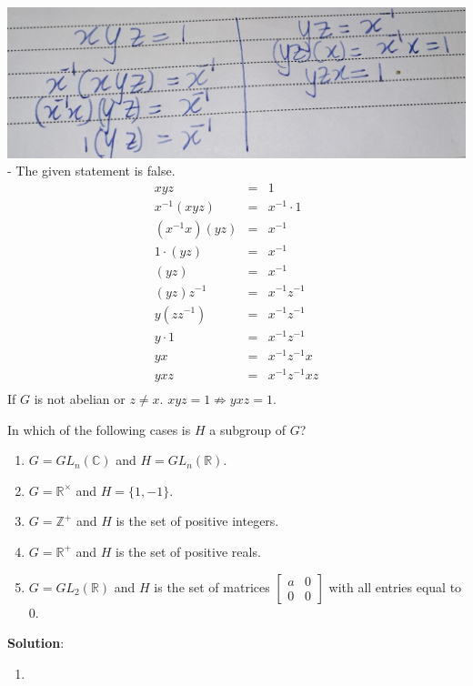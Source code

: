 \documentclass[
]{book}
\providecommand{\tightlist}{%
  \setlength{\itemsep}{0pt}\setlength{\parskip}{0pt}}
\begin{document}
\includegraphics{figures/ch_2/fig18.jpg} - The given statement is false.
\begin{eqnarray}
          xyz&=&1\\
  x^{-1}(xyz)&=&x^{-1} \cdot 1\\
  (x^{-1}x)(yz)&=&x^{-1}\\
  1 \cdot(yz)&=&x^{-1}\\
  (yz)&=&x^{-1}\\
  (yz)z^{-1}&=&x^{-1}z^{-1}\\
  y(zz^{-1})&=&x^{-1}z^{-1}\\
  y \cdot 1&=&x^{-1}z^{-1}\\
  yx&=&x^{-1}z^{-1}x\\
  yxz&=&x^{-1}z^{-1}xz\\
\end{eqnarray} If \(G\) is not abelian or \(z\neq x\).
\(xyz=1 \nRightarrow yxz=1\).

\leavevmode{}%
In which of the following cases is \(H\) a subgroup of \(G\)?

\begin{enumerate}
\def\labelenumi{(\alph{enumi})}
\item
  \(G = GL_n(\mathbb{C})\) and \(H = GL_n(\mathbb{R})\).
\item
  \(G = \mathbb{R}^\times\) and \(H = \{1, -1\}\).
\item
  \(G = \mathbb{Z}^+\) and \(H\) is the set of positive integers.
\item
  \(G = \mathbb{R}^+\) and \(H\) is the set of positive reals.
\item
  \(G = GL_2(\mathbb{R})\) and \(H\) is the set of matrices
  \(\begin{bmatrix} a & 0 \\ 0 & 0 \end{bmatrix}\) with all entries
  equal to 0.
\end{enumerate}

\textbf{Solution}:\\

\begin{enumerate}
\def\labelenumi{(\alph{enumi})}
\tightlist
\item
\end{enumerate}
\end{document}

